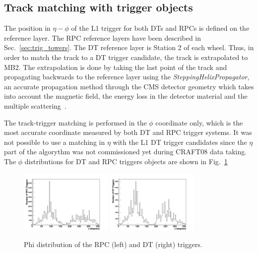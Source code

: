 \subsection{Track matching with trigger objects}
The position in $\eta - \phi$ of the L1 trigger for both DTs and RPCs is defined
on the reference layer. The RPC reference layers have been described
in Sec.~\ref{sec:trig_towers}. The DT reference layer is Station 2 
of each wheel. Thus, in order to match the track to a DT trigger candidate, 
the track is extrapolated to MB2.
The extrapolation is done by taking the last point of the track and 
propagating backwards to the reference layer using 
the {\em SteppingHelixPropagator},
an accurate propagation method through the CMS detector
geometry which takes into account the magnetic field, 
the energy loss in the detector material and the 
multiple scattering~\cite{ref:muonreco_note}.

The track-trigger matching is performed in the $\phi$ coordinate 
only, which is the most accurate coordinate measured by both 
DT and RPC trigger systems. It was not possible to use a matching
in $\eta$ with the L1 DT trigger candidates since the $\eta$ part
of the algorythm was not commissioned yet during CRAFT08 data taking. 
The $\phi$ distributions for DT and
RPC triggers objects are shown in Fig.~\ref{fig:trigger_eta_phi}

\begin{figure}[hbtp]
  \begin{center}
    \includegraphics[width=0.4\textwidth]{phi_rpc}
    \includegraphics[width=0.4\textwidth]{phi_dt}
      \caption{Phi distribution of the RPC (left) and DT (right) triggers.}
    \label{fig:trigger_eta_phi}
  \end{center}
\end{figure}

